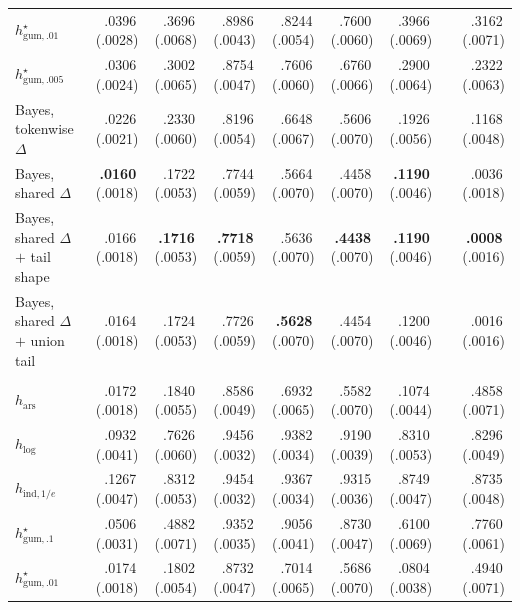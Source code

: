 \documentclass[11pt]{article}
\newcommand{\mcse}[2]{\mbox{#1\,{\fontsize{7}{8}\selectfont(#2)}}}
\newcommand{\bestmcse}[2]{\mbox{\textbf{#1}\,{\fontsize{7}{8}\selectfont(#2)}}}
\begin{document}
\begin{table}[p]
\begin{tabular}{@{}lrrrrrrcr@{}}
$h^\star_{\mathrm{gum},.01}$ & \mcse{.0396}{.0028} & \mcse{.3696}{.0068} & \mcse{.8986}{.0043} & \mcse{.8244}{.0054} & \mcse{.7600}{.0060} & \mcse{.3966}{.0069} & & \mcse{.3162}{.0071} \\
$h^\star_{\mathrm{gum},.005}$ & \mcse{.0306}{.0024} & \mcse{.3002}{.0065} & \mcse{.8754}{.0047} & \mcse{.7606}{.0060} & \mcse{.6760}{.0066} & \mcse{.2900}{.0064} & & \mcse{.2322}{.0063} \\
\addlinespace[1pt]
Bayes, tokenwise $\Delta$ & \mcse{.0226}{.0021} & \mcse{.2330}{.0060} & \mcse{.8196}{.0054} & \mcse{.6648}{.0067} & \mcse{.5606}{.0070} & \mcse{.1926}{.0056} & & \mcse{.1168}{.0048} \\
Bayes, shared $\Delta$ & \bestmcse{.0160}{.0018} & \mcse{.1722}{.0053} & \mcse{.7744}{.0059} & \mcse{.5664}{.0070} & \mcse{.4458}{.0070} & \bestmcse{.1190}{.0046} & & \mcse{.0036}{.0018} \\
Bayes, shared $\Delta$ $+$ tail shape & \mcse{.0166}{.0018} & \bestmcse{.1716}{.0053} & \bestmcse{.7718}{.0059} & \mcse{.5636}{.0070} & \bestmcse{.4438}{.0070} & \bestmcse{.1190}{.0046} & & \bestmcse{.0008}{.0016} \\
Bayes, shared $\Delta$ $+$ union tail & \mcse{.0164}{.0018} & \mcse{.1724}{.0053} & \mcse{.7726}{.0059} & \bestmcse{.5628}{.0070} & \mcse{.4454}{.0070} & \mcse{.1200}{.0046} & & \mcse{.0016}{.0016} \\
\addlinespace[3pt]
\multicolumn{9}{@{}l}{\textit{Horizon $n=300$}}\\
$h_{\mathrm{ars}}$ & \mcse{.0172}{.0018} & \mcse{.1840}{.0055} & \mcse{.8586}{.0049} & \mcse{.6932}{.0065} & \mcse{.5582}{.0070} & \mcse{.1074}{.0044} & & \mcse{.4858}{.0071} \\
$h_{\log}$ & \mcse{.0932}{.0041} & \mcse{.7626}{.0060} & \mcse{.9456}{.0032} & \mcse{.9382}{.0034} & \mcse{.9190}{.0039} & \mcse{.8310}{.0053} & & \mcse{.8296}{.0049} \\
$h_{\mathrm{ind},1/e}$ & \mcse{.1267}{.0047} & \mcse{.8312}{.0053} & \mcse{.9454}{.0032} & \mcse{.9367}{.0034} & \mcse{.9315}{.0036} & \mcse{.8749}{.0047} & & \mcse{.8735}{.0048} \\
$h^\star_{\mathrm{gum},.1}$ & \mcse{.0506}{.0031} & \mcse{.4882}{.0071} & \mcse{.9352}{.0035} & \mcse{.9056}{.0041} & \mcse{.8730}{.0047} & \mcse{.6100}{.0069} & & \mcse{.7760}{.0061} \\
$h^\star_{\mathrm{gum},.01}$ & \mcse{.0174}{.0018} & \mcse{.1802}{.0054} & \mcse{.8732}{.0047} & \mcse{.7014}{.0065} & \mcse{.5686}{.0070} & \mcse{.0804}{.0038} & & \mcse{.4940}{.0071} \\

\end{tabular}
\end{table}
\end{document}

